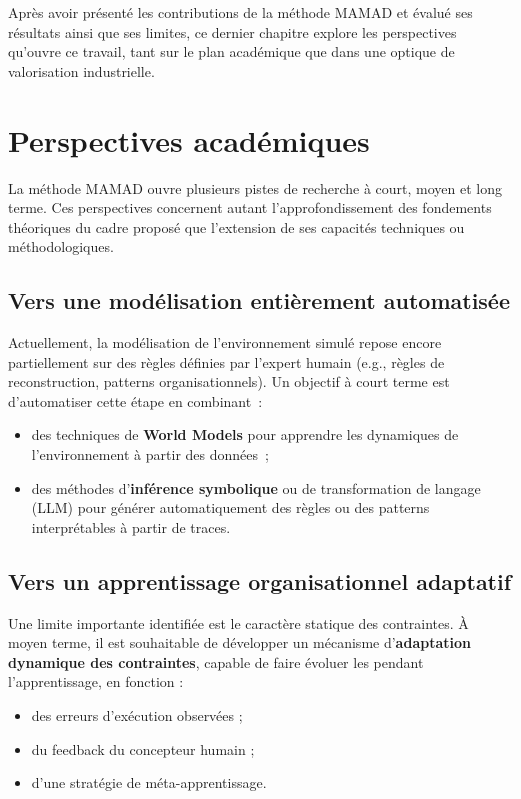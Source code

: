 \noindent
Après avoir présenté les contributions de la méthode \ac{MAMAD} et évalué ses résultats ainsi que ses limites, ce dernier chapitre explore les perspectives qu’ouvre ce travail, tant sur le plan académique que dans une optique de valorisation industrielle.

\section{Perspectives académiques}
\label{sec:perspectives_academiques}

\noindent
La méthode \ac{MAMAD} ouvre plusieurs pistes de recherche à court, moyen et long terme. Ces perspectives concernent autant l’approfondissement des fondements théoriques du cadre proposé que l’extension de ses capacités techniques ou méthodologiques.

\subsection*{Vers une modélisation entièrement automatisée}

Actuellement, la modélisation de l’environnement simulé repose encore partiellement sur des règles définies par l’expert humain (e.g., règles de reconstruction, patterns organisationnels). Un objectif à court terme est d’automatiser cette étape en combinant~:
\begin{itemize}
    \item des techniques de \textbf{World Models} pour apprendre les dynamiques de l’environnement à partir des données~;
    \item des méthodes d’\textbf{inférence symbolique} ou de transformation de langage (LLM) pour générer automatiquement des règles ou des patterns interprétables à partir de traces.
\end{itemize}

\subsection*{Vers un apprentissage organisationnel adaptatif}

Une limite importante identifiée est le caractère statique des contraintes. À moyen terme, il est souhaitable de développer un mécanisme d’\textbf{adaptation dynamique des contraintes}, capable de faire évoluer les  pendant l’apprentissage, en fonction :
\begin{itemize}
    \item des erreurs d’exécution observées ;
    \item du feedback du concepteur humain ;
    \item d’une stratégie de méta-apprentissage.
\end{itemize}

